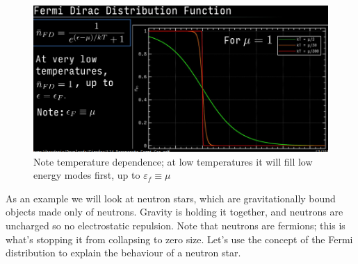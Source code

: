 \documentclass[10pt]{article}
\begin{document}
\begin{definition}
	\begin{figure}[H]
		\centering
		\includegraphics[width=0.8\linewidth]{img/294_fermi_dirac.png}
		\caption{Note temperature dependence; at low temperatures it will fill low energy modes first, up to $ \varepsilon_f \equiv \mu $  }
		\label{fig:294:fermi_dirac}
	\end{figure}


\end{definition}

As an example we will look at neutron stars, which are gravitationally bound objects made only of neutrons. 
Gravity is holding it together, and neutrons are uncharged so no electrostatic repulsion.
Note that neutrons are fermions; this is what's stopping it from collapsing to zero size.
Let's use the concept of the Fermi distribution to explain the behaviour of a neutron star.
\end{document}
